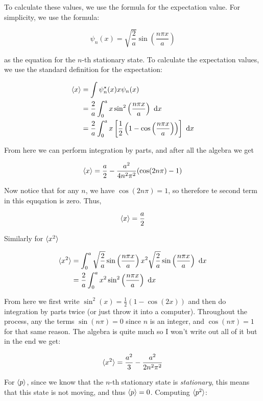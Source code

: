 \documentclass{article}
\begin{document}
    \begin{solution}
        To calculate these values, we use the formula for the expectation value. For simplicity, we use the formula:
        
        \[ \psi_n(x) = \sqrt{\frac{2}{a}} \sin \left(\frac{n \pi x}{a}\right)\]

        as the equation for the $n$-th stationary state. To calculate the expectation values, we use the standard definition for the expectation:

        \begin{align*}
            \langle x \rangle &= \int \psi_n^\star(x) x \psi_n(x)\\
            &= \frac{2}{a} \int_0^a x \sin^2\left(\frac{n \pi x}{a}\right) \ \mathrm d x\\
            &= \frac{2}{a}\int_0^a x \left[\frac{1}{2}\left(1 - \cos \left(\frac{n \pi x}{a}\right)\right)\right] \ \mathrm d x
        \end{align*}

        From here we can perform integration by parts, and after all the algebra we get

        \[ \langle x \rangle = \frac{a}{2} - \frac{a^2}{4n^2\pi^2} (\cos (2 n \pi) - 1)\]

        Now notice that for any $n$, we have $\cos(2n \pi)  = 1$, so therefore te second term in this equqation is zero. Thus, 

        \[ \langle x \rangle = \frac{a}{2}\]

        Similarly for $\langle x^2 \rangle$

        \begin{align*}
            \langle x^2 \rangle &= \int_0^a \sqrt{\frac{2}{a}} \sin \left(\frac{n \pi x}{a}\right) x^2 \sqrt{\frac{2}{a}} \sin \left(\frac{n \pi x}{a}\right) \ \mathrm d x\\
            &= \frac{2}{a}\int_0^a x^2 \sin^2\left(\frac{n \pi x}{a}\right) \ \mathrm d x
        \end{align*}

        From here we first write $\sin^2(x) = \frac{1}{2} (1 - \cos (2x))$ and then do integration by parts twice (or just throw it into a computer). Throughout the process, any the terms $\sin (n\pi) = 0$ since $n$ is an integer, and $\cos (n\pi) = 1$ for that same reason. The algebra is quite much so I won't write out all of it but in the end we get:

        \[ \langle x^2 \rangle = \frac{a^2}{3} - \frac{a^2}{2n^2\pi^2}\]

        For $\langle p \rangle$, since we know that the $n$-th stationary state is \textit{stationary}, this means that this state is not moving, and thus $\langle p \rangle = 0$. Computing $\langle p^2 \rangle$:


\end{solution}
\end{document}
